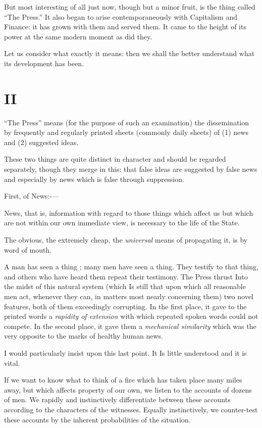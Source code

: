 \documentclass{book}
\begin{document}
But most interesting of all just now, though but a minor fruit, is the thing called “The Press.” It also began to arise contemporaneously with Capitalism and Finance: it has grown with them and served them. It came to the height of its power at the same modern moment as did they.

Let us consider what exactly it means: then we shall the better understand what its development has been.

\chapter*{II}
\label{chapter-3}
“The Press” means (for the purpose of such an examination) the dissemination by frequently and regularly printed sheets (commonly daily sheets) of (1) news and (2) suggested ideas.

These two things are quite distinct in character and should be regarded separately, though they merge in this: that false ideas are suggested by false news and especially by news which is false through suppression.

First, of News:-—

News, that is, information with regard to those things which affect us but which are not within our own immediate view, is necessary to the life of the State.

The obvious, the extremely cheap, the \emph{universal} means of propagating it, is by word of mouth.

A man has seen a thing ; many men have seen a thing. They testify to that thing, and others who have heard them repeat their testimony. The Press thrust Into the midst of this natural system (which Is still that upon which all reasonable men act, whenever they can, in matters most nearly concerning them) two novel features, both of them exceedingly corrupting. In the first place, it gave to the printed words a \emph{rapidity of extension} with which repeated spoken words could not compete. In the second place, it gave them a \emph{mechanical similarity} which was the very opposite to the marks of healthy human news.

I would particularly insist upon this last point. It Is little understood and it is vital.

If we want to know what to think of a fire which has taken place many miles away, but which affects property of our own, we listen to the accounts of dozens of men. We rapidly and instinctively differentiate between these accounts according to the characters of the witnesses. Equally instinctively, we counter-test these accounts by the inherent probabilities of the situation.
\end{document}
